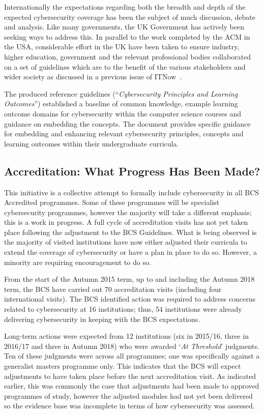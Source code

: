 \documentclass[a4paper,11pt]{article}
\begin{document}
Internationally the expectations regarding both the breadth and depth of the expected cybersecurity coverage has been the subject of much discussion, debate and analysis. Like many governments, the UK Government has actively been seeking ways to address this. In parallel to the work completed by the ACM in the USA, considerable effort in the UK have been taken to ensure industry, higher education, government and the relevant professional bodies collaborated on a set of guidelines which are to the benefit of the various stakeholders and wider society as discussed in a previous issue of ITNow~\cite{Irons2016}.

The produced reference guidelines (``{\emph{Cybersecurity Principles and Learning Outcomes}}'')  established a baseline of common knowledge, example learning outcome domains for cybersecurity within the computer science courses and guidance on embedding the concepts. The document provides specific guidance for embedding and enhancing relevant cybersecurity principles, concepts and learning outcomes within their undergraduate curricula. 

\subsection*{Accreditation: What Progress Has Been Made?}

This initiative is a collective attempt to formally include cybersecurity in all BCS Accredited programmes. Some of these programmes will be specialist cybersecurity programmes, however the majority will take a different emphasis; this is a work in progress. A full cycle of accreditation visits has not yet taken place following the adjustment to the BCS Guidelines. What is being observed is the majority of visited institutions have now either adjusted their curricula to extend the coverage of cybersecurity or have a plan in place to do so. However, a minority are requiring encouragement to do so.

From the start of the Autumn 2015 term, up to and including the Autumn 2018 term, the BCS have carried out 70 accreditation visits (including four international visits). The BCS identified action was required to address concerns related to cybersecurity at 16 institutions; thus, 54 institutions were already delivering cybersecurity in keeping with the BCS expectations.

Long-term actions were expected from 12 institutions (six in 2015/16, three in 2016/17 and three in Autumn 2018) who were awarded `{\emph{At Threshold}}' judgments. Ten of these judgments were across all programmes; one was specifically against a generalist masters programme only. This indicates that the BCS will expect adjustments to have taken place before the next accreditation visit. As indicated earlier, this was commonly the case that adjustments had been made to approved programmes of study, however the adjusted modules had not yet been delivered so the evidence base was incomplete in terms of how cybersecurity was assessed.
 
\end{document}
